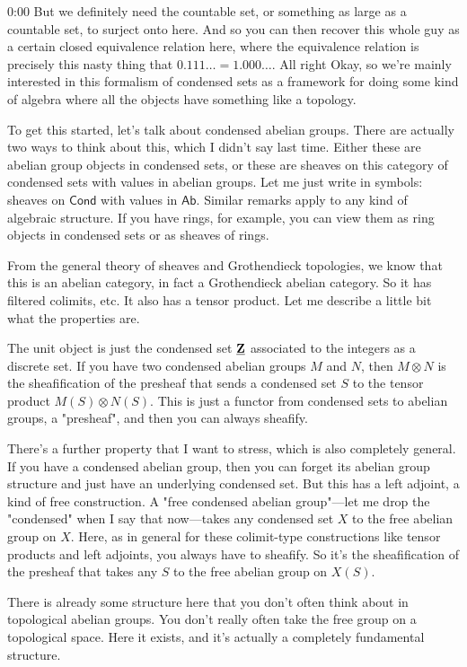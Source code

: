 \begin{unfinished}{0:00}
But we definitely need the countable set, or something as large as a countable set, to surject onto here. And so you can then recover this whole guy as a certain closed equivalence relation here, where the equivalence relation is precisely this nasty thing that $0.111\ldots = 1.000\ldots$. All right
Okay, so we're mainly interested in this formalism of condensed sets as a framework for doing some kind of algebra where all the objects have something like a topology.

To get this started, let's talk about condensed abelian groups. There are actually two ways to think about this, which I didn't say last time. Either these are abelian group objects in condensed sets, or these are sheaves on this category of condensed sets with values in abelian groups. Let me just write in symbols: sheaves on $\mathsf{Cond}$ with values in $\mathsf{Ab}$. Similar remarks apply to any kind of algebraic structure. If you have rings, for example, you can view them as ring objects in condensed sets or as sheaves of rings.

From the general theory of sheaves and Grothendieck topologies, we know that this is an abelian category, in fact a Grothendieck abelian category. So it has filtered colimits, etc. It also has a tensor product. Let me describe a little bit what the properties are.

The unit object is just the condensed set $\underline{\mathbf Z}$ associated to the integers as a discrete set. If you have two condensed abelian groups $M$ and $N$, then $M\otimes N$ is the sheafification of the presheaf that sends a condensed set $S$ to the tensor product $M(S)\otimes N(S)$. This is just a functor from condensed sets to abelian groups, a "presheaf", and then you can always sheafify.

There's a further property that I want to stress, which is also completely general. If you have a condensed abelian group, then you can forget its abelian group structure and just have an underlying condensed set. But this has a left adjoint, a kind of free construction. A "free condensed abelian group"---let me drop the "condensed" when I say that now---takes any condensed set $X$ to the free abelian group on $X$. Here, as in general for these colimit-type constructions like tensor products and left adjoints, you always have to sheafify. So it's the sheafification of the presheaf that takes any $S$ to the free abelian group on $X(S)$.

There is already some structure here that you don't often think about in topological abelian groups. You don't really often take the free group on a topological space. Here it exists, and it's actually a completely fundamental structure.


\end{unfinished}
